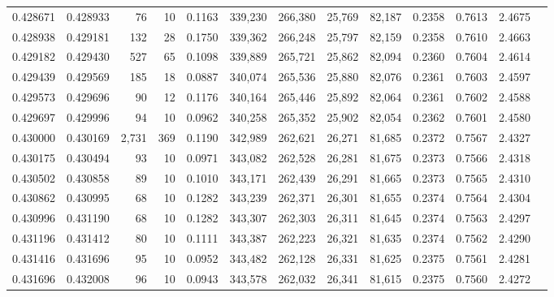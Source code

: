 \begin{tabular}{rrrrrrrrrrrrr}
0.428671 & 0.428933 &    76 &  10 &                                     0.1163 & 339,230 & 266,380 &  25,769 &  82,187 & 0.2358 & 0.7613 & 2.4675 \\
0.428938 & 0.429181 &   132 &  28 &                                     0.1750 & 339,362 & 266,248 &  25,797 &  82,159 & 0.2358 & 0.7610 & 2.4663 \\
0.429182 & 0.429430 &   527 &  65 &                                     0.1098 & 339,889 & 265,721 &  25,862 &  82,094 & 0.2360 & 0.7604 & 2.4614 \\
0.429439 & 0.429569 &   185 &  18 &                                     0.0887 & 340,074 & 265,536 &  25,880 &  82,076 & 0.2361 & 0.7603 & 2.4597 \\
0.429573 & 0.429696 &    90 &  12 &                                     0.1176 & 340,164 & 265,446 &  25,892 &  82,064 & 0.2361 & 0.7602 & 2.4588 \\
0.429697 & 0.429996 &    94 &  10 &                                     0.0962 & 340,258 & 265,352 &  25,902 &  82,054 & 0.2362 & 0.7601 & 2.4580 \\
0.430000 & 0.430169 & 2,731 & 369 &                                     0.1190 & 342,989 & 262,621 &  26,271 &  81,685 & 0.2372 & 0.7567 & 2.4327 \\
0.430175 & 0.430494 &    93 &  10 &                                     0.0971 & 343,082 & 262,528 &  26,281 &  81,675 & 0.2373 & 0.7566 & 2.4318 \\
0.430502 & 0.430858 &    89 &  10 &                                     0.1010 & 343,171 & 262,439 &  26,291 &  81,665 & 0.2373 & 0.7565 & 2.4310 \\
0.430862 & 0.430995 &    68 &  10 &                                     0.1282 & 343,239 & 262,371 &  26,301 &  81,655 & 0.2374 & 0.7564 & 2.4304 \\
0.430996 & 0.431190 &    68 &  10 &                                     0.1282 & 343,307 & 262,303 &  26,311 &  81,645 & 0.2374 & 0.7563 & 2.4297 \\
0.431196 & 0.431412 &    80 &  10 &                                     0.1111 & 343,387 & 262,223 &  26,321 &  81,635 & 0.2374 & 0.7562 & 2.4290 \\
0.431416 & 0.431696 &    95 &  10 &                                     0.0952 & 343,482 & 262,128 &  26,331 &  81,625 & 0.2375 & 0.7561 & 2.4281 \\
0.431696 & 0.432008 &    96 &  10 &                                     0.0943 & 343,578 & 262,032 &  26,341 &  81,615 & 0.2375 & 0.7560 & 2.4272 \\

\end{tabular}
